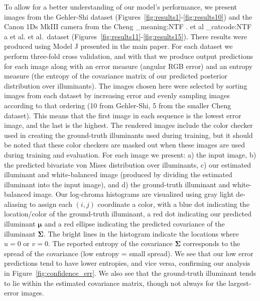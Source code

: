 \documentclass[10pt,twocolumn,letterpaper]{article}
\makeatletter
\newcommand\latinabbrev[1]{
  \peek_meaning:NTF . {%
    #1\@}%
  { \peek_catcode:NTF a {%
      #1.\@ }%
    {#1.\@}}}
\def\etal{\latinabbrev{et al}}
\makeatother
\begin{document}
To allow for a better understanding of our model's performance, we present
images from the Gehler-Shi dataset \cite{Gehler08,shifunt}
(Figures~\ref{fig:results1}-\ref{fig:results10})
and the Canon 1Ds MkIII camera from the Cheng \etal\, dataset \cite{Cheng14}
(Figures~\ref{fig:results11}-\ref{fig:results15}).
There results were produced using Model J presented in the main paper.
For each dataset we perform three-fold cross validation, and with that we produce
output predictions for each image along with an error measure (angular RGB
error) and an entropy measure (the entropy of the covariance matrix of our
predicted posterior distribution over illuminants). The images chosen here were
selected by sorting images from each dataset by increasing error and evenly sampling
images according to that ordering (10 from Gehler-Shi, 5 from the smaller Cheng
dataset).
This means that the first image in each sequence is the lowest error image,
and the last is the highest.
The rendered images include the color checker used in creating the ground-truth
illuminants used during training, but it should be noted that these color checkers
are masked out when these images are used during training and evaluation.
For each image we present: a) the input image, b) the predicted bivariate von Mises
distribution over illuminants, c) our estimated illuminant and white-balanced
image (produced by dividing the estimated illuminant into the input image),
and d) the ground-truth illuminant and white-balanced image.
Our log-chroma histograms are visualized using gray light de-aliasing
to assign each $(i,j)$ coordinate a color,
with a blue dot indicating the location/color of the ground-truth illuminant,
a red dot indicating our predicted illuminant $\boldsymbol{\mu}$
and a red ellipse indicating the predicted covariance of the illuminant $\boldsymbol{\Sigma}$.
The bright lines in the histogram indicate the locations where $u=0$ or $v=0$.
The reported entropy of the covariance $\boldsymbol{\Sigma}$ corresponds to the
spread of the covariance (low entropy = small spread).
We see that our low error predictions tend to
have lower entropies, and vice versa, confirming our analysis in
Figure~\ref{fig:confidence_err}.
We also see that the ground-truth
illuminant tends to lie within the estimated covariance matrix, though not
always for the largest-error images.
\end{document}
